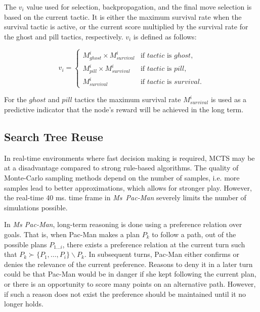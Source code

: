 \documentclass[journal]{IEEEtran}
\begin{document}
The $v_i$ value used for selection, backpropagation, and the final move selection is based on the current tactic. It is either the maximum survival rate when the survival tactic is active, or the current score multiplied by the survival rate for the ghost and pill tactics, respectively.
$v_i$ is defined as follows:

\begin{equation}
v_i =
\begin{cases}
   {M}^i_{ghost} \times {M}^i_{survival} & \text{if $tactic$ is $ghost$}, \\
   {M}^i_{pill} \times {M}^i_{survival} & \text{if $tactic$ is $pill$}, \\
   {M}^i_{survival} & \text{if $tactic$ is $survival$}.
\end{cases}
\label{eq:vi}
\end{equation}

For the $ghost$ and $pill$ tactics the maximum survival rate ${M}^i_{survival}$ is used as a predictive indicator that the node's reward will be achieved in the long term.


\subsection{Search Tree Reuse}
\label{reuse}
In real-time environments where fast decision making is required, MCTS may be at a disadvantage compared to strong rule-based algorithms. The quality of Monte-Carlo sampling methods depend on the number of samples, i.e. more samples lead to better approximations, which allows for stronger play. However, the real-time 40 ms. time frame in {\it{Ms~Pac-Man}} severely limits the number of simulations possible. 

In {\it{Ms Pac-Man}}, long-term reasoning is done using a preference relation over goals. That is, when Pac-Man makes a plan $P_k$ to follow a path, out of the possible plans $P_{1 \ldots i}$, there exists a preference relation at the current turn such that $P_k \succ \{P_1, \ldots, P_i\} \backslash P_k$. In subsequent turns, Pac-Man either confirms or denies the relevance of the current preference. Reasons to deny it in a later turn could be that Pac-Man would be in danger if she kept following the current plan, or there is an opportunity to score many points on an alternative path. However, if such a reason does not exist the preference should be maintained until it no longer holds.
\end{document}
